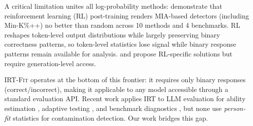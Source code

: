 A critical limitation unites all log-probability methods: \citet{wang2025fragility} demonstrate that reinforcement learning (RL) post-training renders MIA-based detectors (including Min-K\%++) no better than random across 10 methods and 4 benchmarks.
RL reshapes token-level output distributions while largely preserving binary correctness patterns, so token-level statistics lose signal while binary response patterns remain available for analysis.
\citet{selfcritique2026} and \citet{zhang2026rlvr} propose RL-specific solutions but require generation-level access.

IRT-\textsc{Fit} operates at the bottom of this frontier: it requires only binary responses (correct/incorrect), making it applicable to any model accessible through a standard evaluation API.
Recent work applies IRT to LLM evaluation for ability estimation \citep{martinezplumed2019, polo2024tinybenchmarks}, adaptive testing \citep{atlas2025}, and benchmark diagnostics \citep{psnirt2026}, but none use \emph{person-fit} statistics for contamination detection.
Our work bridges this gap.